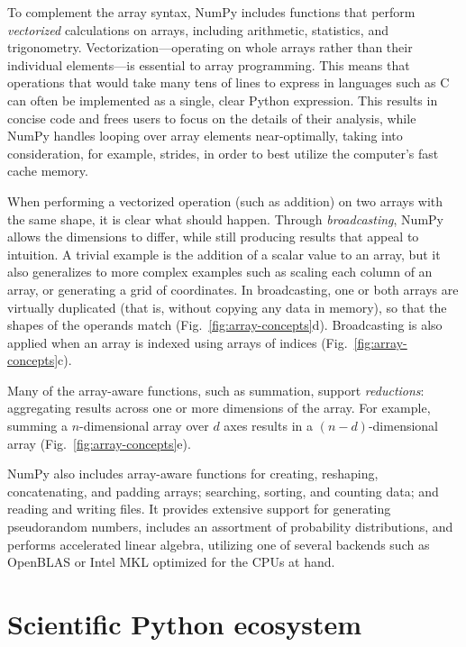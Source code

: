 To complement the array syntax, NumPy includes functions that perform
\emph{vectorized} calculations on arrays, including arithmetic, statistics, and
trigonometry.
Vectorization---operating on whole arrays rather than their individual
elements---is essential to array programming.
This means that operations that would take many tens of lines to express in
languages such as C can often be implemented as a single, clear Python
expression.
This results in concise code and frees users to focus on the details of
their analysis, while NumPy handles looping over array elements near-optimally,
taking into consideration, for example, strides, in order to best utilize the
computer's fast cache memory.

When performing a vectorized operation (such as addition) on two arrays with
the same shape, it is clear what should happen.
Through \emph{broadcasting}, NumPy allows the dimensions to differ, while
still producing results that appeal to intuition.
A trivial example is the addition of a scalar value to an array, but it also
generalizes to more complex examples such as scaling each column of an array,
or generating a grid of coordinates.
In broadcasting, one or both arrays are virtually duplicated (that is, without
copying any data in memory), so that the shapes of the operands match
(Fig.~\ref{fig:array-concepts}d).
Broadcasting is also applied when an array is indexed using arrays of
indices (Fig.~\ref{fig:array-concepts}c).

Many of the array-aware functions, such as summation, support \emph{reductions}: aggregating
results across one or more dimensions of the array.
For example, summing a $n$-dimensional array over $d$ axes results in a
$(n-d)$-dimensional array (Fig.~\ref{fig:array-concepts}e).

NumPy also includes array-aware functions for creating, reshaping, concatenating, and padding
arrays; searching, sorting, and counting data; and reading and writing files.
It provides extensive support for generating pseudorandom numbers,
includes an assortment of probability distributions, and
performs accelerated linear algebra, utilizing one of several backends
such as OpenBLAS \cite{wang2013augem,xianyi2012model} or Intel MKL optimized
for the CPUs at hand.


\section*{Scientific Python ecosystem}

